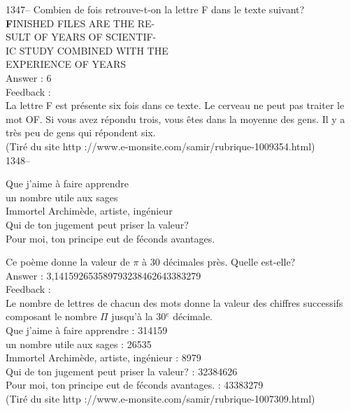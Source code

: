 \documentclass[letterpaper, 12pt]{article}
\begin{document}
1347-- Combien de fois retrouve-t-on la lettre F dans le texte suivant?\\

{\Large\textbf FINISHED FILES ARE THE RE-\\
SULT OF YEARS OF SCIENTIF-\\
IC STUDY COMBINED WITH THE \\
EXPERIENCE OF YEARS}\\


Answer : 6\\

Feedback : \\
La lettre F est pr\'esente six fois dans ce texte. Le cerveau ne
peut pas traiter le mot \og OF\fg .  Si vous avez r\'epondu trois,
vous \^etes dans la moyenne des gens.  Il y a tr\`es peu de gens qui r\'epondent six.  \\
(Tir\'e du site http ://www.e-monsite.com/samir/rubrique-1009354.html)\\

1348-- \begin{center}{Que j'aime \`a faire apprendre\\
un nombre utile aux sages\\
Immortel Archim\`ede, artiste, ing\'enieur\\
Qui de ton jugement peut priser la valeur?\\
Pour moi, ton principe eut de f\'econds avantages.\\}\end{center} Ce
po\`eme donne la valeur de $\pi$ \`a 30 d\'ecimales pr\`es. Quelle
est-elle?\\

Answer : 3,141592653589793238462643383279\\

Feedback : \\
Le nombre de lettres de chacun des mots donne la valeur des chiffres
successifs composant le nombre $\Pi$ jusqu'\`a la 30$^e$ d\'ecimale.\\

Que j'aime \`a faire apprendre : 314159\\
un nombre utile aux sages : 26535\\
Immortel Archim\`ede, artiste, ing\'enieur : 8979\\
Qui de ton jugement peut priser la valeur? : 32384626\\
Pour moi, ton principe eut de f\'econds avantages. : 43383279\\
(Tir\'e du site http ://www.e-monsite.com/samir/rubrique-1007309.html)\\
\end{document}
